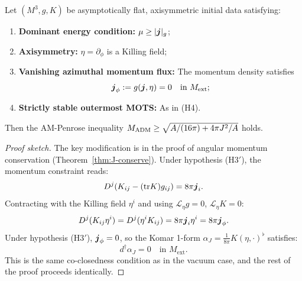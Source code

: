 \begin{proposition}\label{prop:non-vacuum-extension}
Let $(M^3, g, K)$ be asymptotically flat, axisymmetric initial data satisfying:
\begin{enumerate}[label=\textup{(H\arabic*$'$)}]
    \item \textbf{Dominant energy condition:} $\mu \geq |\boldsymbol{j}|_g$;
    \item \textbf{Axisymmetry:} $\eta = \partial_\phi$ is a Killing field;
    \item \textbf{Vanishing azimuthal momentum flux:} The momentum density satisfies 
    \begin{equation}\label{eq:no-j-phi}
    \boldsymbol{j}_\phi := g(\boldsymbol{j}, \eta) = 0 \quad \text{in } M_{\mathrm{ext}};
    \end{equation}
    \item \textbf{Strictly stable outermost MOTS:} As in (H4).
\end{enumerate}
Then the AM-Penrose inequality $M_{\mathrm{ADM}} \geq \sqrt{A/(16\pi) + 4\pi J^2/A}$ holds.
\end{proposition}

\begin{proof}[Proof sketch]
The key modification is in the proof of angular momentum conservation (Theorem~\ref{thm:J-conserve}). Under hypothesis (H3$'$), the momentum constraint reads:
\[
D^j(K_{ij} - (\mathrm{tr} K)g_{ij}) = 8\pi \boldsymbol{j}_i.
\]
Contracting with the Killing field $\eta^i$ and using $\mathcal{L}_\eta g = 0$, $\mathcal{L}_\eta K = 0$:
\[
D^j(K_{ij}\eta^i) = D^j(\eta^i K_{ij}) = 8\pi \boldsymbol{j}_i \eta^i = 8\pi \boldsymbol{j}_\phi.
\]
Under hypothesis (H3$'$), $\boldsymbol{j}_\phi = 0$, so the Komar 1-form $\alpha_J = \frac{1}{8\pi}K(\eta, \cdot)^\flat$ satisfies:
\[
d^\dagger \alpha_J = 0 \quad \text{in } M_{\mathrm{ext}}.
\]
This is the same co-closedness condition as in the vacuum case, and the rest of the proof proceeds identically.
\end{proof}

